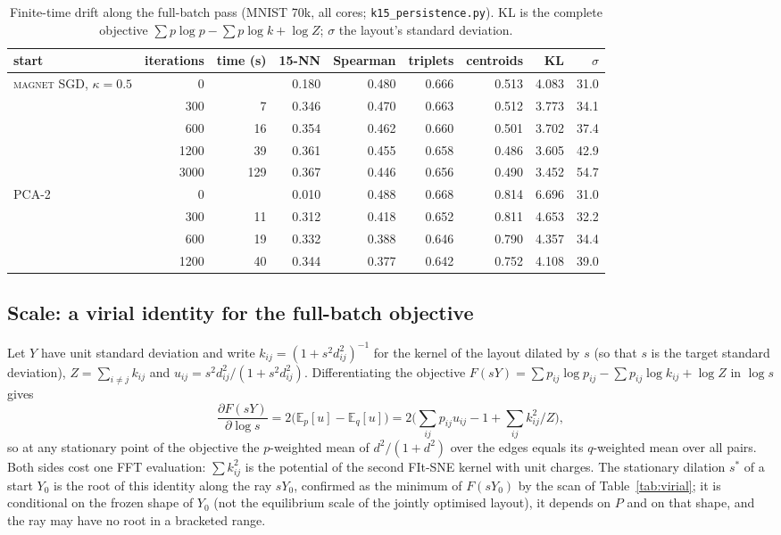 \documentclass[11pt]{article}
\newcommand{\magnet}{\textsc{magnet}}
\begin{document}
\begin{table}[t]
\centering\small
\caption{Finite-time drift along the full-batch pass (MNIST 70k, all cores;
\texttt{k15\_persistence.py}). KL is the complete objective $\sum p \log p - \sum p \log k + \log Z$; $\sigma$ the layout's
standard deviation.}
\label{tab:persist}
\begin{tabular}{lrrrrrrrr}
\toprule
start & iterations & time (s) & 15-NN & Spearman & triplets & centroids & KL & $\sigma$ \\
\midrule
\magnet{} SGD, $\kappa = 0.5$ & 0 & & 0.180 & 0.480 & 0.666 & 0.513 & 4.083 & 31.0 \\
 & 300 & 7 & 0.346 & 0.470 & 0.663 & 0.512 & 3.773 & 34.1 \\
 & 600 & 16 & 0.354 & 0.462 & 0.660 & 0.501 & 3.702 & 37.4 \\
 & 1200 & 39 & 0.361 & 0.455 & 0.658 & 0.486 & 3.605 & 42.9 \\
 & 3000 & 129 & 0.367 & 0.446 & 0.656 & 0.490 & 3.452 & 54.7 \\
\midrule
PCA-2 & 0 & & 0.010 & 0.488 & 0.668 & 0.814 & 6.696 & 31.0 \\
 & 300 & 11 & 0.312 & 0.418 & 0.652 & 0.811 & 4.653 & 32.2 \\
 & 600 & 19 & 0.332 & 0.388 & 0.646 & 0.790 & 4.357 & 34.4 \\
 & 1200 & 40 & 0.344 & 0.377 & 0.642 & 0.752 & 4.108 & 39.0 \\
\bottomrule
\end{tabular}
\end{table}

\subsection{Scale: a virial identity for the full-batch objective}\label{sec:virial}
Let $Y$ have unit standard deviation and write $k_{ij} = (1 + s^2 d_{ij}^2)^{-1}$ for the kernel of the
layout dilated by $s$ (so that $s$ is the target standard deviation), $Z = \sum_{i \ne j} k_{ij}$ and
$u_{ij} = s^2 d_{ij}^2 / (1 + s^2 d_{ij}^2)$. Differentiating the objective $F(sY) = \sum p_{ij} \log p_{ij}
- \sum p_{ij} \log k_{ij} + \log Z$ in $\log s$ gives
\[
\frac{\partial F(sY)}{\partial \log s} = 2\Big(\mathbb{E}_p[u] - \mathbb{E}_q[u]\Big)
= 2\Big(\textstyle\sum_{ij} p_{ij} u_{ij} - 1 + \sum_{ij} k_{ij}^2 / Z\Big),
\]
so at any stationary point of the objective the $p$-weighted mean of $d^2/(1+d^2)$ over the edges equals its
$q$-weighted mean over all pairs. Both sides cost one FFT evaluation: $\sum k_{ij}^2$ is the potential of
the second FIt-SNE kernel with unit charges. The stationary dilation $s^\ast$ of a start $Y_0$ is the
root of this identity along the ray $sY_0$, confirmed as the minimum of $F(sY_0)$ by the scan of
Table~\ref{tab:virial}; it is conditional on the frozen shape of $Y_0$ (not the equilibrium scale of the
jointly optimised layout), it depends on $P$ and on that shape, and the ray may have no root in a
bracketed range.
\end{document}
